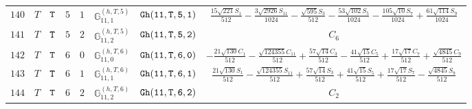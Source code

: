 \documentclass[fleqn,8pt]{jsarticle}
\begin{document}
\begin{table}[ht!]
\begin{center}
\begin{tabular}{cccccccc}
$ 140 $ & $ T $ & $ {\tt T} $ & $ 5 $ & $ 1 $ & $ \mathbb{G}_{11,1}^{(h,T,5)} $ & $ {\tt Gh(11,T,5,1)} $ & $ \frac{15 \sqrt{221} S_{1}}{512} - \frac{3 \sqrt{2926} S_{11}}{1024} - \frac{\sqrt{595} S_{3}}{512} - \frac{53 \sqrt{102} S_{5}}{1024} - \frac{105 \sqrt{10} S_{7}}{1024} + \frac{61 \sqrt{114} S_{9}}{1024} $ \\
$ 141 $ & $ T $ & $ {\tt T} $ & $ 5 $ & $ 2 $ & $ \mathbb{G}_{11,2}^{(h,T,5)} $ & $ {\tt Gh(11,T,5,2)} $ & $ C_{6} $ \\
$ 142 $ & $ T $ & $ {\tt T} $ & $ 6 $ & $ 0 $ & $ \mathbb{G}_{11,0}^{(h,T,6)} $ & $ {\tt Gh(11,T,6,0)} $ & $ - \frac{21 \sqrt{130} C_{1}}{512} - \frac{\sqrt{124355} C_{11}}{512} + \frac{57 \sqrt{14} C_{3}}{512} - \frac{41 \sqrt{15} C_{5}}{512} + \frac{17 \sqrt{17} C_{7}}{512} + \frac{\sqrt{4845} C_{9}}{512} $ \\
$ 143 $ & $ T $ & $ {\tt T} $ & $ 6 $ & $ 1 $ & $ \mathbb{G}_{11,1}^{(h,T,6)} $ & $ {\tt Gh(11,T,6,1)} $ & $ \frac{21 \sqrt{130} S_{1}}{512} - \frac{\sqrt{124355} S_{11}}{512} + \frac{57 \sqrt{14} S_{3}}{512} + \frac{41 \sqrt{15} S_{5}}{512} + \frac{17 \sqrt{17} S_{7}}{512} - \frac{\sqrt{4845} S_{9}}{512} $ \\
$ 144 $ & $ T $ & $ {\tt T} $ & $ 6 $ & $ 2 $ & $ \mathbb{G}_{11,2}^{(h,T,6)} $ & $ {\tt Gh(11,T,6,2)} $ & $ C_{2} $ \\
 \hline \hline
\end{tabular}
\end{center}
\end{table}
\end{document}

